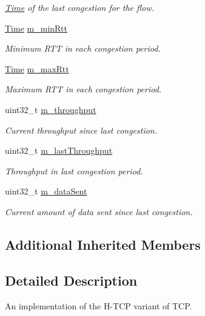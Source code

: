 \begin{DoxyCompactItemize}
\begin{DoxyCompactList}\small\item\em \hyperlink{classns3_1_1Time}{Time} of the last congestion for the flow. \end{DoxyCompactList}\item 
\hyperlink{classns3_1_1Time}{Time} \hyperlink{classns3_1_1TcpHtcp_a0cfba062b9ea4dddf100bde861e2265b}{m\+\_\+min\+Rtt}
\begin{DoxyCompactList}\small\item\em Minimum R\+TT in each congestion period. \end{DoxyCompactList}\item 
\hyperlink{classns3_1_1Time}{Time} \hyperlink{classns3_1_1TcpHtcp_a91edf7c0c42f5996d3d066ce98551c31}{m\+\_\+max\+Rtt}
\begin{DoxyCompactList}\small\item\em Maximum R\+TT in each congestion period. \end{DoxyCompactList}\item 
uint32\+\_\+t \hyperlink{classns3_1_1TcpHtcp_aff553c6ce4a85bf1fcdc441dd5f7245d}{m\+\_\+throughput}
\begin{DoxyCompactList}\small\item\em Current throughput since last congestion. \end{DoxyCompactList}\item 
uint32\+\_\+t \hyperlink{classns3_1_1TcpHtcp_a5961ae9da66b8f4b0af86a83ba7c0481}{m\+\_\+last\+Throughput}
\begin{DoxyCompactList}\small\item\em Throughput in last congestion period. \end{DoxyCompactList}\item 
uint32\+\_\+t \hyperlink{classns3_1_1TcpHtcp_a263e88a7986de6a76ff85ac7d6d25ab5}{m\+\_\+data\+Sent}
\begin{DoxyCompactList}\small\item\em Current amount of data sent since last congestion. \end{DoxyCompactList}\end{DoxyCompactItemize}
\subsection*{Additional Inherited Members}


\subsection{Detailed Description}
An implementation of the H-\/\+T\+CP variant of T\+CP. 

